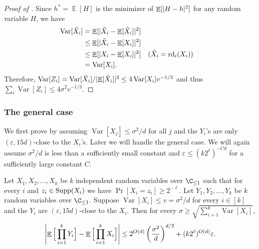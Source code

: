 \documentclass{toc}
\def\eps{\varepsilon}
\def\Blocklength{\ell}
\def\rd{\textnormal{rd}}
\def\Supp{\textnormal{Supp}}
\DeclarePairedDelimiter{\abs}{\lvert}{\rvert}
\DeclareMathOperator*{\E}{\mathbb{E}}                 %
\DeclareMathOperator*{\Var}{Var}                 %
\begin{document}
  \begin{proof}[Proof of {}]
    Since $h^\ast = \E[H]$ is the minimizer of $\E[\abs{H - h}^2]$ for any random variable $H$, we have
    \begin{align*}
      \Var[\tilde X_i]
      &= \E[ \abs{\tilde X_i - \E[\tilde X_i]}^2 ] \\
      &\le \E[ \abs{\tilde X_i - \E[X_i]}^2 ] \\
      &\le \E[ \abs{X_i - \E[X_i]}^2 ] && \text{($\tilde X_i = \rd_i(X_i)$)} \\
      &= \Var[X_i] . &&
    \end{align*}
    Therefore, $\Var[Z_i] = \Var[\tilde X_i] / \abs{\E[\tilde X_i]}^2 \le 4 \Var[X_i] v^{-1/3}$ and thus $\sum_i \Var[Z_i] \le 4 \sigma^2 v^{-1/3}$.
  \end{proof}

  \subsubsection{The general case}
  We first prove  by assuming $\Var[X_j] \le \sigma^2 / d$ for all $j$ and the $Y_i$'s are only $(\eps, 15d)$-close to the $X_i$'s.
    Later we will handle the general case.
    We will again assume $\sigma^2 / d$ is less than a sufficiently small constant and $\eps \le (k 2^\Blocklength)^{-Cd}$ for a sufficiently large constant $C$.

    \begin{lemma} \label{lemma:GKM-bounded-var}
    Let $X_1, X_2, \ldots, X_k$ be $k$ independent random variables over $\C_{\le 1}$ such that for every $i$ and $z_i \in \Supp(X_i)$ we have $\Pr[X_i = z_i] \ge 2^{-\Blocklength}$.
    Let $Y_1, Y_2, \ldots, Y_k$ be $k$ random variables over $\C_{\le 1}$.
    Suppose $\Var[X_i] \le v = \sigma^2/d$ for every $i \in [k]$ and the $Y_i$ are $(\eps, 15d)$-close to the $X_i$.
    Then for every $\sigma \ge \sqrt{\sum_{i=1}^k \Var[X_i]}$, 
    \[
      \abs*{ \E \Big[ \prod_{i=1}^k Y_i \Big] - \E \Big[ \prod_{i=1}^k X_i \Big] }
      \le 2^{O(d)} \left( \frac{\sigma^2}{d} \right)^{d/2} + (k 2^\Blocklength)^{O(d)} \eps.
    \]
	\end{lemma}
\end{document}
